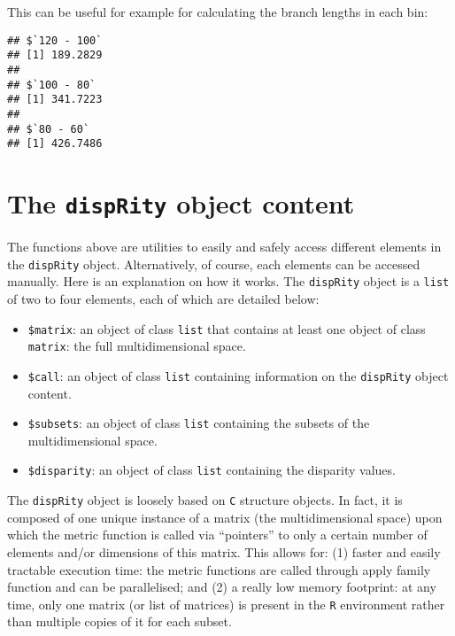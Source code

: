 \documentclass[
]{book}
\newenvironment{Shaded}{\begin{snugshade}}{\end{snugshade}}
\newcommand{\ControlFlowTok}[1]{\textcolor[rgb]{0.13,0.29,0.53}{\textbf{#1}}}
\newcommand{\DocumentationTok}[1]{\textcolor[rgb]{0.56,0.35,0.01}{\textbf{\textit{#1}}}}
\newcommand{\FunctionTok}[1]{\textcolor[rgb]{0.13,0.29,0.53}{\textbf{#1}}}
\newcommand{\NormalTok}[1]{#1}
\newcommand{\SpecialCharTok}[1]{\textcolor[rgb]{0.81,0.36,0.00}{\textbf{#1}}}
\providecommand{\tightlist}{%
  \setlength{\itemsep}{0pt}\setlength{\parskip}{0pt}}
\begin{document}
This can be useful for example for calculating the branch lengths in each bin:

\begin{Shaded}
\end{Shaded}

\begin{verbatim}
## $`120 - 100`
## [1] 189.2829
## 
## $`100 - 80`
## [1] 341.7223
## 
## $`80 - 60`
## [1] 426.7486
\end{verbatim}

\hypertarget{disprity-object}{%
\section{\texorpdfstring{The \texttt{dispRity} object content}{The dispRity object content}}\label{disprity-object}}

The functions above are utilities to easily and safely access different elements in the \texttt{dispRity} object.
Alternatively, of course, each elements can be accessed manually.
Here is an explanation on how it works.
The \texttt{dispRity} object is a \texttt{list} of two to four elements, each of which are detailed below:

\begin{itemize}
\tightlist
\item
  \texttt{\$matrix}: an object of class \texttt{list} that contains at least one object of class \texttt{matrix}: the full multidimensional space.
\item
  \texttt{\$call}: an object of class \texttt{list} containing information on the \texttt{dispRity} object content.
\item
  \texttt{\$subsets}: an object of class \texttt{list} containing the subsets of the multidimensional space.
\item
  \texttt{\$disparity}: an object of class \texttt{list} containing the disparity values.
\end{itemize}

The \texttt{dispRity} object is loosely based on \texttt{C} structure objects.
In fact, it is composed of one unique instance of a matrix (the multidimensional space) upon which the metric function is called via ``pointers'' to only a certain number of elements and/or dimensions of this matrix.
This allows for: (1) faster and easily tractable execution time: the metric functions are called through apply family function and can be parallelised; and (2) a really low memory footprint: at any time, only one matrix (or list of matrices) is present in the \texttt{R} environment rather than multiple copies of it for each subset.
\end{document}
